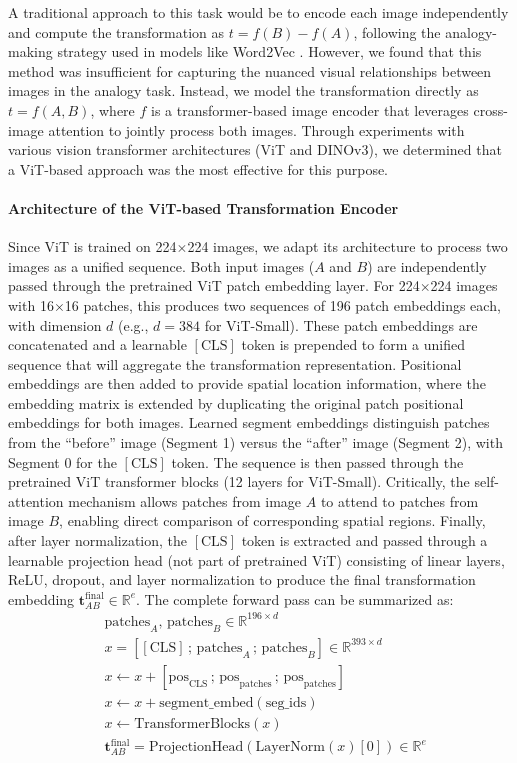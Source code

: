 \documentclass[twocolumn]{article} %
\begin{document}
A traditional approach to this task would be to encode each image independently and compute the transformation as \(t = f(B) - f(A)\), following the analogy-making strategy used in models like Word2Vec \cite{mikolov2013efficient}. However, we found that this method was insufficient for capturing the nuanced visual relationships between images in the analogy task. Instead, we model the transformation directly as \(t = f(A, B)\), where $f$ is a transformer-based image encoder that leverages cross-image attention to jointly process both images. Through experiments with various vision transformer architectures (ViT and DINOv3), we determined that a ViT-based approach was the most effective for this purpose.

\paragraph{Architecture of the ViT-based Transformation Encoder}
Since ViT is trained on 224$\times$224 images, we adapt its architecture to process two images as a unified sequence. Both input images ($A$ and $B$) are independently passed through the pretrained ViT patch embedding layer. For 224$\times$224 images with 16$\times$16 patches, this produces two sequences of 196 patch embeddings each, with dimension $d$ (e.g., $d=384$ for ViT-Small). These patch embeddings are concatenated and a learnable $[\text{CLS}]$ token is prepended to form a unified sequence that will aggregate the transformation representation. Positional embeddings are then added to provide spatial location information, where the embedding matrix is extended by duplicating the original patch positional embeddings for both images. Learned segment embeddings distinguish patches from the ``before'' image (Segment 1) versus the ``after'' image (Segment 2), with Segment 0 for the $[\text{CLS}]$ token. The sequence is then passed through the pretrained ViT transformer blocks (12 layers for ViT-Small). Critically, the self-attention mechanism allows patches from image $A$ to attend to patches from image $B$, enabling direct comparison of corresponding spatial regions. Finally, after layer normalization, the $[\text{CLS}]$ token is extracted and passed through a learnable projection head (not part of pretrained ViT) consisting of linear layers, ReLU, dropout, and layer normalization to produce the final transformation embedding $\mathbf{t}_{AB}^{\text{final}} \in \mathbb{R}^{e}$.
The complete forward pass can be summarized as:
\begin{align*}
    &\text{patches}_A,\, \text{patches}_B \in \mathbb{R}^{196 \times d} \\
    &x = [\![\text{CLS}]\,;\, \text{patches}_A\,;\, \text{patches}_B] \in \mathbb{R}^{393 \times d} \\
    &x \leftarrow x + [\text{pos}_{\text{CLS}}\,;\, \text{pos}_{\text{patches}}\,;\, \text{pos}_{\text{patches}}] \\
    &x \leftarrow x + \text{segment\_embed}(\text{seg\_ids}) \\
    &x \leftarrow \text{TransformerBlocks}(x) \\
    &\mathbf{t}_{AB}^{\text{final}} = \text{ProjectionHead}(\text{LayerNorm}(x)[0]) \in \mathbb{R}^{e}
\end{align*}
\end{document}
